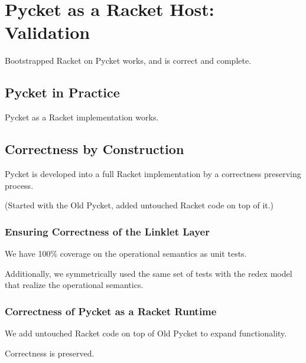 \chapter{Pycket as a Racket Host: Validation}

	\begin{chapterpoint}
		Bootstrapped Racket on Pycket works, and is correct and complete.
	\end{chapterpoint}

	\section{Pycket in Practice}

		\begin{mainpoint}
			Pycket as a Racket implementation works.
		\end{mainpoint}

	\section{Correctness by Construction}

		\begin{mainpoint}
			Pycket is developed into a full Racket implementation by a correctness preserving process. 
			
			(Started with the Old Pycket, added untouched Racket code on top of it.)
		\end{mainpoint}

		\subsection{Ensuring Correctness of the Linklet Layer}
			\begin{mainpoint}
				We have 100\% coverage on the operational semantics as unit tests.
				
				Additionally, we symmetrically used the same set of tests with the redex model that realize the operational semantics.
			\end{mainpoint}

		\subsection{Correctness of Pycket as a Racket Runtime}
			\begin{mainpoint}
				We add untouched Racket code on top of Old Pycket to expand functionality.

				Correctness is preserved.
			\end{mainpoint}

